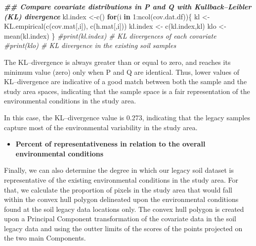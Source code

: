 \documentclass[
  10pt,
  b5paper,
  oneside]{book}
\newenvironment{Shaded}{\begin{snugshade}}{\end{snugshade}}
\newcommand{\CommentTok}[1]{\textcolor[rgb]{0.56,0.35,0.01}{\textit{#1}}}
\newcommand{\ControlFlowTok}[1]{\textcolor[rgb]{0.13,0.29,0.53}{\textbf{#1}}}
\newcommand{\DecValTok}[1]{\textcolor[rgb]{0.00,0.00,0.81}{#1}}
\newcommand{\DocumentationTok}[1]{\textcolor[rgb]{0.56,0.35,0.01}{\textbf{\textit{#1}}}}
\newcommand{\FunctionTok}[1]{\textcolor[rgb]{0.00,0.00,0.00}{#1}}
\newcommand{\NormalTok}[1]{#1}
\newcommand{\OtherTok}[1]{\textcolor[rgb]{0.56,0.35,0.01}{#1}}
\newcommand{\SpecialCharTok}[1]{\textcolor[rgb]{0.00,0.00,0.00}{#1}}
\providecommand{\tightlist}{%
  \setlength{\itemsep}{0pt}\setlength{\parskip}{0pt}}
\begin{document}
\begin{Shaded}
\begin{Highlighting}[]
  \DocumentationTok{\#\# Compare covariate distributions in P and Q with Kullback–Leibler (KL) divergence}
\NormalTok{      kl.index }\OtherTok{\textless{}{-}}\FunctionTok{c}\NormalTok{()}
      \ControlFlowTok{for}\NormalTok{(i }\ControlFlowTok{in} \DecValTok{1}\SpecialCharTok{:}\FunctionTok{ncol}\NormalTok{(cov.dat.df))\{}
\NormalTok{        kl }\OtherTok{\textless{}{-}}    \FunctionTok{KL.empirical}\NormalTok{(}\FunctionTok{c}\NormalTok{(cov.mat[,i]), }\FunctionTok{c}\NormalTok{(h.mat[,i]))}
\NormalTok{        kl.index }\OtherTok{\textless{}{-}} \FunctionTok{c}\NormalTok{(kl.index,kl)}
\NormalTok{        klo }\OtherTok{\textless{}{-}}  \FunctionTok{mean}\NormalTok{(kl.index)}
\NormalTok{      \}}
      \CommentTok{\#print(kl.index) \# KL divergences of each covariate}
      \CommentTok{\#print(klo) \# KL divergence in the existing soil samples}
\end{Highlighting}
\end{Shaded}

The KL--divergence is always greater than or equal to zero, and reaches its minimum value (zero) only when P and Q are identical. Thus, lower values of KL--divergence are indicative of a good match between both the sample and the study area spaces, indicating that the sample space is a fair representation of the environmental conditions in the study area.

In this case, the KL--divergence value is 0.273, indicating that the legacy samples capture most of the environmental variability in the study area.

\begin{itemize}
\tightlist
\item
  \textbf{Percent of representativeness in relation to the overall environmental conditions}
\end{itemize}

Finally, we can also determine the degree in which our legacy soil dataset is representative of the existing environmental conditions in the study area. For that, we calculate the proportion of pixels in the study area that would fall within the convex hull polygon delineated upon the environmental conditions found at the soil legacy data locations only. The convex hull polygon is created upon a Principal Component transformation of the covariate data in the soil legacy data and using the outter limits of the scores of the points projected on the two main Components.
\end{document}
